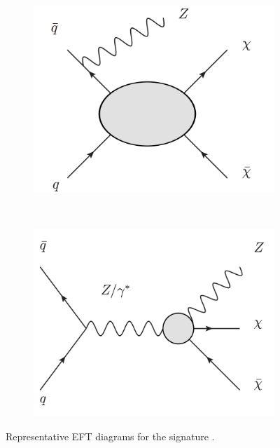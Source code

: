 \begin{figure}[htb]
    \centering
    \begin{subfigure}[b]{0.35\textwidth}
        \includegraphics[width=\textwidth]{Figures/eft1.png}
        \label{fig:eft1}
    \end{subfigure}
    ~ %
    \begin{subfigure}[b]{0.35\textwidth}
        \includegraphics[width=\textwidth]{Figures/eft2.png}
        \label{fig:eft2}
    \end{subfigure}
    \caption{Representative EFT diagrams for the \monoZ signature \cite{Beltran:2010ww}.}
\label{fig:efts}
\end{figure}

